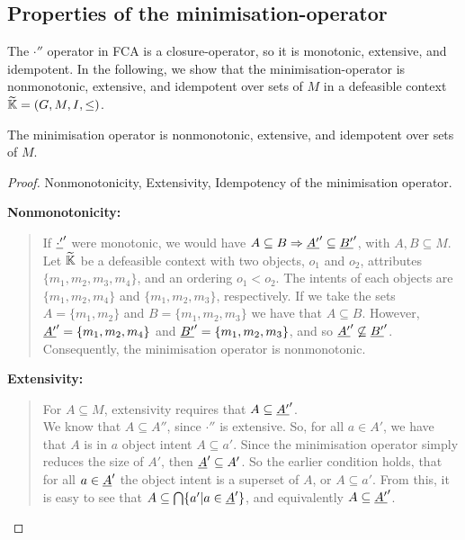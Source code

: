\documentclass[11pt]{article}
\begin{document}
\subsection{Properties of the minimisation-operator}
\label{subsection:properties-min-operator}
The $\cdot''$ operator in FCA is a closure-operator, so it is monotonic, extensive, and idempotent. In the following, we show that the minimisation-operator is nonmonotonic, extensive, and idempotent over sets of $M$ in a defeasible context $\widetilde{\mathbb{K}} = (G,M,I,\leq)$.

\begin{proposition}
  \label{proposition-min_operator}
  The minimisation operator is nonmonotonic, extensive, and idempotent over sets of $M$.
\end{proposition}

\begin{proof}
  Nonmonotonicity, Extensivity, Idempotency of the minimisation operator.

  \textbf{Nonmonotonicity:}

  \begin{quotation}
    \noindent If $\underline{\cdot'}'$ were monotonic, we would have $A \subseteq B \Rightarrow \underline{A'}' \subseteq \underline{B'}'$, with $A,B \subseteq M$. \\

    \noindent Let $\widetilde{\mathbb{K}}$ be a defeasible context with two objects, $o_1$ and $o_2$, attributes $\{m_1, m_2, m_3, m_4\}$, and an ordering $o_1 < o_2$. The intents of each objects are $\{m_1, m_2, m_4\}$ and $\{m_1, m_2, m_3\}$, respectively. If we take the sets $A = \{m_1,m_2\}$ and $B = \{m_1, m_2, m_3\}$ we have that $A\subseteq B$. However, $\underline{A'}' = \{m_1, m_2, m_4\}$ and $\underline{B'}' = \{m_1, m_2, m_3\}$, and so $\underline{A'}' \not \subseteq \underline{B'}'$. Consequently, the minimisation operator is nonmonotonic.
  \end{quotation}

  \textbf{Extensivity:}
  \begin{quotation}
    \noindent For $A \subseteq M$, extensivity requires that $A \subseteq \underline{A'}'$.\\

    \noindent We know that $A \subseteq A''$, since $\cdot''$ is extensive. So, for all $a \in A'$, we have that $A$ is in $a$ object intent $A \subseteq a'$. Since the minimisation operator simply reduces the size of $A'$, then $\underline{A}' \subseteq A'$. So the earlier condition holds, that for all $a \in \underline{A}'$ the object intent is a superset of $A$, or $A \subseteq a'$. From this, it is easy to see that $A \subseteq \bigcap \{a' | a \in \underline{A}'\}$, and equivalently $A \subseteq \underline{A'}'$.


\end{quotation}
\end{proof}
\end{document}
